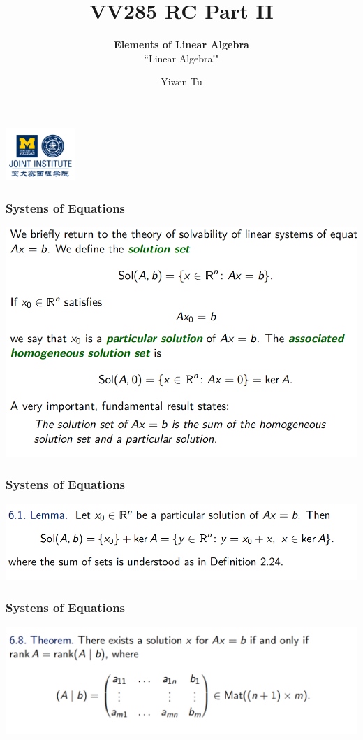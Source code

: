\documentclass[12pt, t]{beamer}
\title{VV285 RC Part II}
\subtitle{\textbf{Elements of Linear Algebra}\\``Linear Algebra!"}
\institute[UM-SJTU JI]{Univerity of Michigan-Shanghai Jiao Tong University Joint Institute}
\author{Yiwen Tu}
\begin{document}
\begin{frame}
    \titlepage
    \begin{center}
        \includegraphics[height=2cm]{logo2.png}
    \end{center}
\end{frame}

\begin{frame}
    \frametitle{Systens of Equations}
    \begin{center}
        \includegraphics[width=\textwidth]{0}
    \end{center}
\end{frame}

\begin{frame}
    \frametitle{Systens of Equations}
    \begin{center}
        \includegraphics[width=\textwidth]{2}
    \end{center}
\end{frame}

\begin{frame}
    \frametitle{Systens of Equations}
    \begin{center}
        \includegraphics[width=\textwidth]{3}
    \end{center}
\end{frame}
\end{document}
